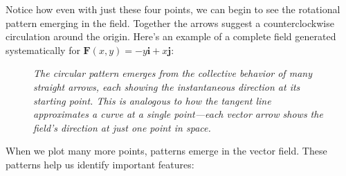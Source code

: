 \noindent Notice how even with just these four points, we can begin to see the rotational pattern emerging in the field. Together the arrows suggest a counterclockwise circulation around the origin. Here's an example of a complete field generated systematically for $\mathbf{F}(x,y) = -y\mathbf{i} + x\mathbf{j}$:

\begin{figure}[H]
\centering
\caption{\textit{The circular pattern emerges from the collective behavior of many straight arrows, each showing the instantaneous direction at its starting point. This is analogous to how the tangent line approximates a curve at a single point—each vector arrow shows the field's direction at just one point in space.}}
\end{figure}


\noindent When we plot many more points, patterns emerge in the vector field. These patterns help us identify important features:

